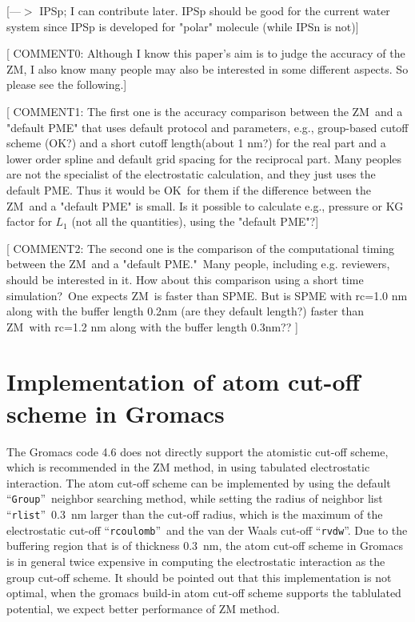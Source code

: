 \documentclass[a4paper,preprint,unsortedaddress,onecolumn,fleqn]{revtex4}
\newcommand{\recheck}[1]{{\color{red} #1}}
\begin{document}
[{\color{blue}---$>$ IPSp; I can contribute later. IPSp should be good for
the current water system since IPSp is developed for "polar" molecule (while
IPSn is not)}]

[ {\color{blue} COMMENT0: Although I know this paper's aim is to judge the
accuracy of the ZM, I also know many people may also be interested in some
different aspects. So please see the following.}]

[ {\color{blue} COMMENT1: The first one is the accuracy comparison between
the ZM\ and a "default PME" that uses default protocol and parameters, e.g.,
group-based cutoff scheme (OK?) and a short cutoff length(about 1 nm?) for
the real part and a lower order spline and default grid spacing for the
reciprocal part. Many peoples are not the specialist of the electrostatic
calculation, and they just uses the default PME. Thus it would be OK\ for
them if the difference between the ZM\ and a "default PME" is small. Is it
possible to calculate e.g., pressure or KG factor for {$L_{1}$} (n{ot all
the quantities}), using the {"default PME"?}}]

[ {\color{blue} COMMENT2: The second one is the comparison of the
computational timing between the ZM\ and a "default PME."\ Many people,
including e.g. reviewers, should be interested in it. How about this
comparison using a short time simulation?\ One expects ZM\ is faster than
SPME. But is SPME with rc=1.0 nm along with the buffer length 0.2nm (are
they default length?) faster than ZM\ with rc=1.2 nm along with the buffer
length 0.3nm?? }]


\appendix

\section{Implementation of atom cut-off scheme in Gromacs}

\label{app:cut-off}

The Gromacs code 4.6 does not directly support the atomistic cut-off scheme, 
{\color{blue}which is recommended in the ZM method, in }using tabulated
electrostatic interaction. The atom cut-off scheme can be implemented by
using the default \textquotedblleft \texttt{Group}\textquotedblright\
neighbor searching method, while setting the radius of neighbor list
\textquotedblleft \texttt{rlist}\textquotedblright\ 0.3~nm larger than the
cut-off radius, which is the maximum of the electrostatic cut-off
\textquotedblleft \texttt{rcoulomb}\textquotedblright\ and the van der Waals
cut-off \textquotedblleft \texttt{rvdw}\textquotedblright . Due to the
buffering region that is of thickness 0.3~nm, the atom cut-off scheme in
Gromacs is in general \recheck{twice} expensive \recheck{in computing the electrostatic interaction} as the group cut-off scheme.
\recheck{It should be pointed out that this implementation is not optimal,
  when the gromacs build-in atom cut-off scheme supports the tablulated potential, we expect better performance of ZM method.}
\end{document}
